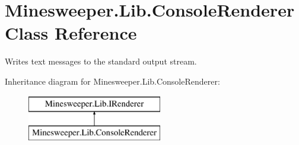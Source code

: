 \hypertarget{class_minesweeper_1_1_lib_1_1_console_renderer}{\section{Minesweeper.\+Lib.\+Console\+Renderer Class Reference}
\label{class_minesweeper_1_1_lib_1_1_console_renderer}
}


Writes text messages to the standard output stream.  


Inheritance diagram for Minesweeper.\+Lib.\+Console\+Renderer\+:\begin{figure}[H]
\begin{center}
\leavevmode
\includegraphics[height=2.000000cm]{class_minesweeper_1_1_lib_1_1_console_renderer}
\end{center}
\end{figure}
